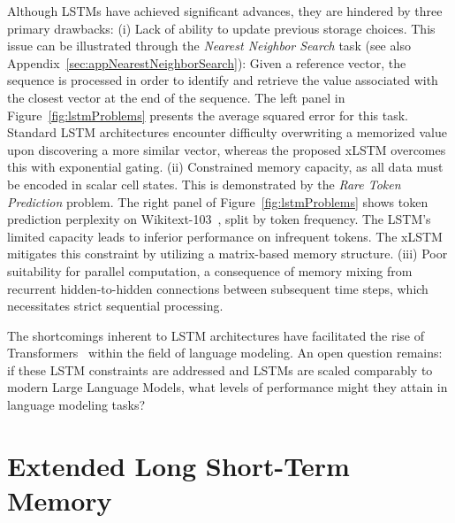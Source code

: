 Although LSTMs have achieved significant advances, they are hindered by three primary drawbacks: (i) Lack of ability to update previous storage choices. This issue can be illustrated through the {\it Nearest Neighbor Search} task (see also Appendix~\ref{sec:appNearestNeighborSearch}): Given a reference vector, the sequence is processed in order to identify and retrieve the value associated with the closest vector at the end of the sequence. The left panel in Figure~\ref{fig:lstmProblems} presents the average squared error for this task. Standard LSTM architectures encounter difficulty overwriting a memorized value upon discovering a more similar vector, whereas the proposed xLSTM overcomes this with exponential gating. (ii) Constrained memory capacity, as all data must be encoded in scalar cell states. This is demonstrated by the {\it Rare Token Prediction} problem. The right panel of Figure~\ref{fig:lstmProblems} shows token prediction perplexity on Wikitext-103~\citep{Merity:17}, split by token frequency. The LSTM's limited capacity leads to inferior performance on infrequent tokens. The xLSTM mitigates this constraint by utilizing a matrix-based memory structure. (iii) Poor suitability for parallel computation, a consequence of memory mixing from recurrent hidden-to-hidden connections between subsequent time steps, which necessitates strict sequential processing.

The shortcomings inherent to LSTM architectures have facilitated the rise of Transformers~\citep{Vaswani:17} within the field of language modeling. An open question remains: if these LSTM constraints are addressed and LSTMs are scaled comparably to modern Large Language Models, what levels of performance might they attain in language modeling tasks?

\section{Extended Long Short-Term Memory}
\label{sec:xLSTM}

